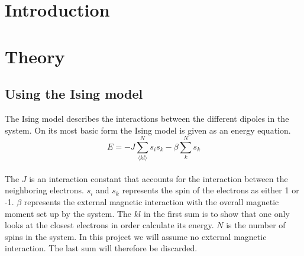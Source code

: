 \documentclass{article}
\begin{document}
\section{Introduction} \label{sec:Introduction}

\iffalse
The simulation consisted of a 2-dimensional lattice with spins pointing up or down. These spins would flip depending on whether the energy it would gain was great enough. This would lead to the system converging to the most likely state, also known as equilibrium. As will be shown, this most likely state converges at different speeds depending on variables like temperature and lattice-size. Using some statistics one can gleam into the physical attributes of the system and gain insight into similar systems in real life. The critical temperature (hereby also the phase transition point) being the apex of what this report covers. \\
\fi

\vspace{1cm}

\section{Theory} \label{sec:Theory}

\iffalse
\subsection{Using the Ising model} \label{sec:isingmodel}

The Ising model describes the interactions between the different dipoles in the system. On its most basic form the Ising model is given as an energy equation. \\

\begin{equation} \label{eq:isingmodel}
    E = -J \sum_{ \langle kl \rangle }^{N} s_i s_k - \beta \sum_{k}^{N}s_k
\end{equation} \\

The $J$ is an interaction constant that accounts for the interaction between the neighboring electrons. $s_i$ and $s_k$ represents the spin of the electrons as either 1 or -1. $\beta$ represents the external magnetic interaction with the overall magnetic moment set up by the system. The $kl$ in the first sum is to show that one only looks at the closest electrons in order calculate its energy. $N$ is the number of spins in the system. In this project we will assume no external magnetic interaction. The last sum will therefore be discarded. \cite{isingmodel} \\
\end{document}
